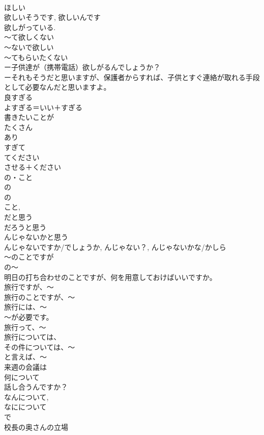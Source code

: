\documentclass[8pt]{extreport}
\begin{document}
\begin{CJK}{UTF8}{min}
\\	ほしい
\\	欲しいそうです, 欲しいんです 
\\	欲しがっている.
\\	～て欲しくない
\\	～ないで欲しい
\\	～てもらいたくない
\\	ー子供達が（携帯電話）欲しがるんでしょうか？　
\\	ーそれもそうだと思いますが、保護者からすれば、子供とすぐ連絡が取れる手段として必要なんだと思いますよ。	
\\	良すぎる
\\	よすぎる＝いい＋すぎる
\\	書きたいことが
\\	たくさん
\\	あり
\\	すぎて
\\	てください
\\	させる＋ください 
\\	の・こと
\\	の 
\\	の 
\\	こと, 
\\	だと思う 
\\	だろうと思う 
\\	んじゃないかと思う 
\\	んじゃないですか/でしょうか, んじゃない？, んじゃないかな/かしら 
\\	～のことですが
\\	の～
\\	明日の打ち合わせのことですが、何を用意しておけばいいですか。
\\	旅行ですが、～　
\\	旅行のことですが、～　
\\	旅行には、～
\\	～が必要です。
\\	旅行って、～
\\	旅行については、
\\	その件については、～
\\	と言えば、～
\\	来週の会議は
\\	何について
\\	話し合うんですか？　　
\\	なんについて, 
\\	なにについて
\\	で 
\\	校長の奥さんの立場

\end{CJK}
\end{document}
